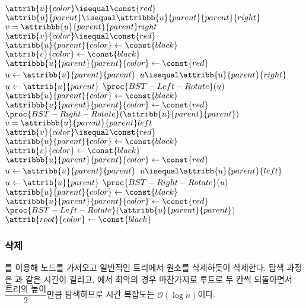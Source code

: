\begin{codebox}
\li \While $\attrib{u}{color} \isequal \const{red}$ \Do
\li     \If $\attrib{u}{parent} \isequal \attribbb{u}{parent}{parent}{right}$ \Then
\li         $v = \attribbb{u}{parent}{parent}right$
\li         \If $\attrib{v}{color} \isequal \const{red}$ \Then
\li             $\attribb{u}{parent}{color} \gets \const{black}$
\li             $\attrib{v}{color} \gets \const{black}$
\li             $\attribbb{u}{parent}{parent}{color} \gets \const{red}$
\li             $u \gets \attribb{u}{parent}{parent}$
\li         \ElseNoIf
\li             \If $u \isequal \attribb{u}{parent}{right}$ \Then
\li                 $u \gets \attrib{u}{parent}$
\li                 $\proc{BST-Left-Rotate}(u)$
                \End
\li             $\attribb{u}{parent}{color} \gets \const{black}$
\li             $\attribbb{u}{parent}{parent}{color} \gets \const{red}$
\li             $\proc{BST-Right-Rotate}(\attribb{u}{parent}{parent})$
            \End
\li     \ElseNoIf
\li         $v = \attribbb{u}{parent}{parent}left$
\li         \If $\attrib{v}{color} \isequal \const{red}$ \Then
\li             $\attribb{u}{parent}{color} \gets \const{black}$
\li             $\attrib{v}{color} \gets \const{black}$
\li             $\attribbb{u}{parent}{parent}{color} \gets \const{red}$
\li             $u \gets \attribb{u}{parent}{parent}$
\li         \ElseNoIf
\li             \If $u \isequal \attribb{u}{parent}{left}$ \Then
\li                 $u \gets \attrib{u}{parent}$
\li                 $\proc{BST-Right-Rotate}(u)$
                \End
\li             $\attribb{u}{parent}{color} \gets \const{black}$
\li             $\attribbb{u}{parent}{parent}{color} \gets \const{red}$
\li             $\proc{BST-Left-Rotate}(\attribb{u}{parent}{parent})$
            \End
        \End
    \End
\li $\attrib{root}{color} \gets \const{black}$
\end{codebox}

\newpage

\subsubsection{삭제} 를 이용해 노드를 가져오고 일반적인 트리에서 원소를 삭제하듯이 삭제한다.
 탐색 과정은 과 같은 시간이 걸리고, 에서 최악의 경우
마찬가지로 루트로 두 칸씩 되돌아면서 $\dfrac{\mbox{트리의 높이}}{2}$만큼 탐색하므로 시간 복잡도는 $\mathcal{O}\left(\log n\right)$이다.

